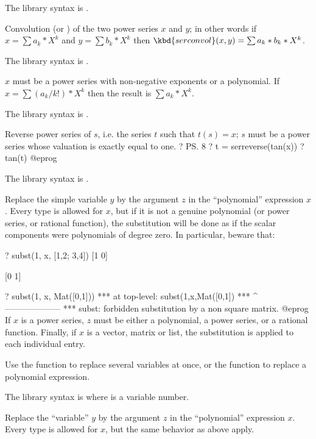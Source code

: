 The library syntax is .

\label{se:serconvol}
Convolution (or ) of the
two power series $x$ and $y$; in other words if $x=\sum a_k*X^k$ and $y=\sum
b_k*X^k$ then $\kbd{serconvol}(x,y)=\sum a_k*b_k*X^k$.

The library syntax is .

\label{se:serlaplace}
$x$ must be a power series with non-negative
exponents or a polynomial. If $x=\sum (a_k/k!)*X^k$ then the result is $\sum
a_k*X^k$.

The library syntax is .

\label{se:serreverse}
Reverse power series of $s$, i.e. the series $t$ such that $t(s) = x$;
$s$ must be a power series whose valuation is exactly equal to one.
\bprog
? \ps 8
? t = serreverse(tan(x))
? tan(t)
@eprog

The library syntax is .

\label{se:subst}
Replace the simple variable $y$ by the argument $z$ in the ``polynomial''
expression $x$. Every type is allowed for $x$, but if it is not a genuine
polynomial (or power series, or rational function), the substitution will be
done as if the scalar components were polynomials of degree zero. In
particular, beware that:

\bprog
? subst(1, x, [1,2; 3,4])
[1 0]

[0 1]

? subst(1, x, Mat([0,1]))
  ***   at top-level: subst(1,x,Mat([0,1])
  ***                 ^--------------------
  *** subst: forbidden substitution by a non square matrix.
@eprog\noindent
If $x$ is a power series, $z$ must be either a polynomial, a power
series, or a rational function. Finally, if $x$ is a vector,
matrix or list, the substitution is applied to each individual entry.

Use the function  to replace several variables at once,
or the function  to replace a polynomial expression.

The library syntax is  where  is a variable number.

\label{se:substpol}
Replace the ``variable'' $y$ by the argument $z$ in the ``polynomial''
expression $x$. Every type is allowed for $x$, but the same behavior
as  above apply.

